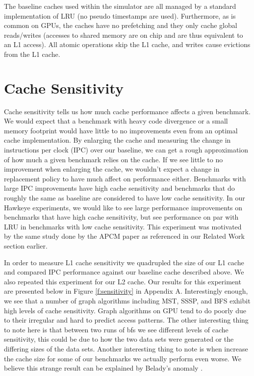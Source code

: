 The baseline caches used within the simulator are all managed by a standard implementation of LRU (no pseudo timestamps are used). Furthermore, as is common on GPUs, the caches have no prefetching and they only cache global reads/writes (accesses to shared memory are on chip and are thus equivalent to an L1 access). All atomic operations skip the L1 cache, and writes cause evictions from the L1 cache.

\section{Cache Sensitivity}
Cache sensitivity tells us how much cache performance affects a given benchmark. We would expect that a benchmark with heavy code divergence or a small memory footprint would have little to no improvements even from an optimal cache implementation. By enlarging the cache and measuring the change in instructions per clock (IPC) over our baseline, we can get a rough approximation of how much a given benchmark relies on the cache. If we see little to no improvement when enlarging the cache, we wouldn't expect a change in replacement policy to have much affect on performance either. Benchmarks with large IPC improvements have high cache sensitivity and benchmarks that do roughly the same as baseline are considered to have low cache sensitivity. In our Hawkeye experiments, we would like to see large performance improvements on benchmarks that have high cache sensitivity, but see performance on par with LRU in benchmarks with low cache sensitivity. This experiment was motivated by the same study done by the APCM paper as referenced in our Related Work section earlier.

In order to measure L1 cache sensitivity we quadrupled the size of our L1 cache and compared IPC performance against our baseline cache described above. We also repeated this experiment for our L2 cache. Our results for this experiment are presented below in Figure \ref{f:sensitivity} in Appendix A. Interestingly enough, we see that a number of graph algorithms including MST, SSSP, and BFS exhibit high levels of cache sensitivity. Graph algorithms on GPU tend to do poorly due to their irregular and hard to predict access patterns. The other interesting thing to note here is that between two runs of bfs we see different levels of cache sensitivity, this could be due to how the two data sets were generated or the differing sizes of the data sets. Another interesting thing to note is when increase the cache size for some of our benchmarks we actually perform even worse. We believe this strange result can be explained by Belady’s anomaly \cite{belady_anomaly}.


